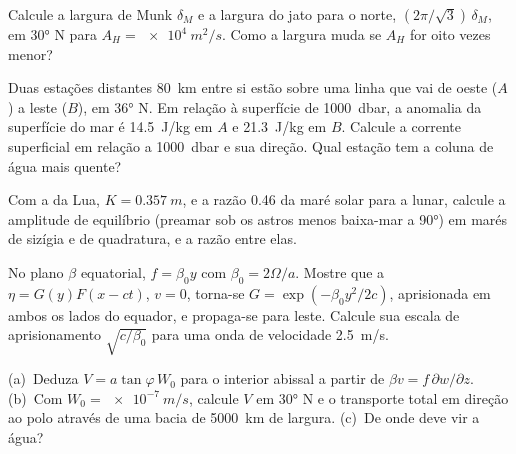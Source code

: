 \begin{exercise}[$\star\star$]\label{exo:b3:ocean-dynamics:7}
Calcule a largura de Munk $\delta_M$ e a largura do jato para o norte,
$(2\pi/\sqrt3)\,\delta_M$, em \ang{30} N para $A_H = \qty{e4}{m^2/s}$. Como
a largura muda se $A_H$ for oito vezes menor?
\end{exercise}

\begin{exercise}[$\star\star$]\label{exo:b3:ocean-dynamics:8}
Duas estações distantes \qty{80}{km} entre si estão sobre uma linha que vai de oeste ($A$)
a leste ($B$), em \ang{36} N. Em relação à superfície de \qty{1000}{dbar}, a
anomalia  da superfície do mar é \qty{14.5}{J/kg} em $A$ e
\qty{21.3}{J/kg} em $B$. Calcule a corrente superficial em relação a
\qty{1000}{dbar} e sua direção. Qual estação tem a coluna de água
mais quente?
\end{exercise}

\begin{exercise}[$\star\star$]\label{exo:b3:ocean-dynamics:9}
Com a  da Lua, $K = \qty{0.357}{m}$, e a razão
\num{0.46} da maré solar para a lunar, calcule a amplitude de equilíbrio
(preamar sob os astros menos baixa-mar a \ang{90}) em marés de sizígia e
de quadratura, e a razão entre elas.
\end{exercise}

\begin{exercise}[$\star\star\star$]\label{exo:b3:ocean-dynamics:10}
No plano $\beta$ equatorial, $f = \beta_0y$ com $\beta_0 =
2\Omega/a$. Mostre que a  $\eta = G(y)F(x - ct)$, $v = 0$,
torna-se $G = \exp(-\beta_0y^2/2c)$, aprisionada em ambos os lados do equador,
e propaga-se para leste. Calcule sua escala de aprisionamento $\sqrt{c/\beta_0}$ para uma
onda de velocidade \qty{2.5}{m/s}.
\end{exercise}

\begin{exercise}[$\star\star\star$]\label{exo:b3:ocean-dynamics:11}
(a)~Deduza $V = a\tan\varphi\,W_0$ para o interior abissal a partir de $\beta v =
f\,\partial w/\partial z$. (b)~Com $W_0 = \qty{e-7}{m/s}$, calcule $V$ em
\ang{30} N e o transporte total em direção ao polo através de uma bacia
de \qty{5000}{km} de largura. (c)~De onde deve vir a água?
\end{exercise}

